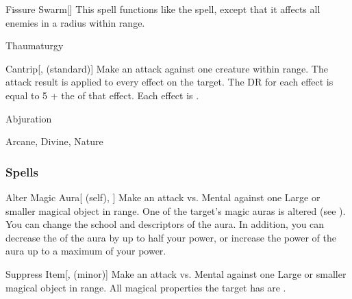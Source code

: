 \lowercase{\hypertarget{spell:Fissure Swarm}{}}\label{spell:Fissure Swarm}
\begin{ability}[\nth{6}]{\hypertarget{spell:Fissure Swarm}{Fissure Swarm}}[]
This spell functions like the  spell, except that it affects all enemies in a \areamed radius within \rngmed range.
\end{ability}
\vspace{0.25em}


\newpage
\begin{spellsection}{Thaumaturgy}


\begin{ability}{Cantrip}[,  (standard)]
Make an attack against one creature within \rngmed range.
The attack result is applied to every  effect on the target.
The DR for each effect is equal to 5 + the  of that effect.
\hit Each effect is .
\end{ability}




 Abjuration

 Arcane, Divine, Nature
\end{spellsection}


\subsubsection{Spells}


\lowercase{\hypertarget{spell:Alter Magic Aura}{}}\label{spell:Alter Magic Aura}
\begin{ability}[\nth{1}]{\hypertarget{spell:Alter Magic Aura}{Alter Magic Aura}}[ (self), ]
Make an attack vs. Mental against one Large or smaller magical object in \rngmed range.
\hit One of the target's magic auras is altered (see ).
You can change the school and descriptors of the aura.
In addition, you can decrease the  of the aura by up to half your power, or increase the power of the aura up to a maximum of your power.
\end{ability}
\vspace{0.25em}



\lowercase{\hypertarget{spell:Suppress Item}{}}\label{spell:Suppress Item}
\begin{ability}[\nth{1}]{\hypertarget{spell:Suppress Item}{Suppress Item}}[,  (minor)]
Make an attack vs. Mental against one Large or smaller magical object in \rngmed range.
\hit All magical properties the target has are .
\end{ability}
\vspace{0.25em}



